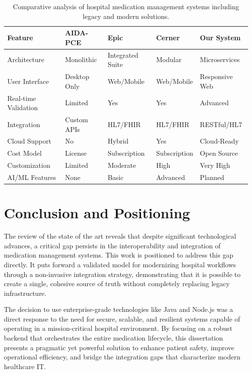 \begin{table}[H]
    \centering
    \caption{Comparative analysis of hospital medication management systems including legacy and modern solutions.}
    \label{tab:comparison}
    \begin{tabularx}{\textwidth}{@{}l|X|X|X|X@{}}
        \toprule
        \textbf{Feature} & \textbf{AIDA-PCE} & \textbf{Epic} & \textbf{Cerner} & \textbf{Our System} \\
        \midrule
        Architecture & Monolithic & Integrated Suite & Modular & Microservices \\
        User Interface & Desktop Only & Web/Mobile & Web/Mobile & Responsive Web \\
        Real-time Validation & Limited & Yes & Yes & Advanced \\
        Integration & Custom APIs & HL7/FHIR & HL7/FHIR & RESTful/HL7 \\
        Cloud Support & No & Hybrid & Yes & Cloud-Ready \\
        Cost Model & License & Subscription & Subscription & Open Source \\
        Customization & Limited & Moderate & High & Very High \\
        AI/ML Features & None & Basic & Advanced & Planned \\
        \bottomrule
    \end{tabularx}
\end{table}

\section{Conclusion and Positioning}

The review of the state of the art reveals that despite significant technological advances, a critical gap persists in the interoperability and integration of medication management systems. This work is positioned to address this gap directly. It puts forward a validated model for modernizing hospital workflows through a non-invasive integration strategy, demonstrating that it is possible to create a single, cohesive source of truth without completely replacing legacy infrastructure.

The decision to use enterprise-grade technologies like Java and Node.js was a direct response to the need for secure, scalable, and resilient systems capable of operating in a mission-critical hospital environment. By focusing on a robust backend that orchestrates the entire medication lifecycle, this dissertation presents a pragmatic yet powerful solution to enhance patient safety, improve operational efficiency, and bridge the integration gaps that characterize modern healthcare IT. 